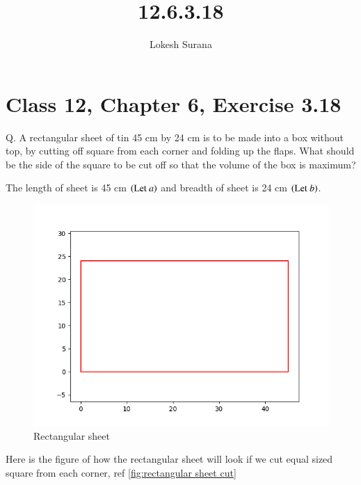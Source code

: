 \documentclass[journal,12pt,twocolumn]{IEEEtran}
\begin{document}
\vspace{3cm}
\title{12.6.3.18}
\author{Lokesh Surana}
\maketitle
\section*{Class 12, Chapter 6, Exercise 3.18}

Q. A rectangular sheet of tin 45 cm by 24 cm is to be made into a box without top, by cutting off square from each corner and folding up the flaps. What should be the side of the square to be cut off so that the volume of the box is maximum?

\solution The length of sheet is 45 cm $\left(\text{Let } a\right)$ and breadth of sheet is 24 cm $\left(\text{Let }b\right)$.

\begin{figure}[!htb]
    \centering
    \includegraphics[width=\columnwidth]{figs/rectangle1.png}
    \caption{Rectangular sheet}
    \label{fig:rectangular sheet}
\end{figure}

Here is the figure of how the rectangular sheet will look if we cut equal sized square from each corner, ref \eqref{fig:rectangular sheet cut}
\end{document}
